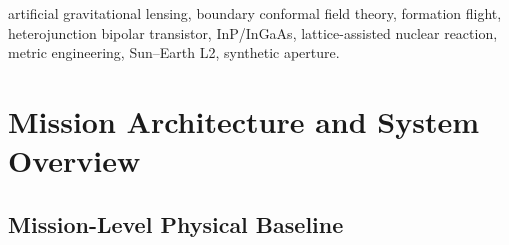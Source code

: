 \documentclass[10pt,twocolumn]{IEEEtran}
\begin{document}
\begin{IEEEkeywords}
artificial gravitational lensing, boundary conformal field theory, formation flight, heterojunction bipolar transistor, InP/InGaAs, lattice-assisted nuclear reaction, metric engineering, Sun--Earth L2, synthetic aperture.
\end{IEEEkeywords}

\section{Mission Architecture and System Overview}
\label{sec:mission_architecture}

\subsection{Mission-Level Physical Baseline}
\end{document}
